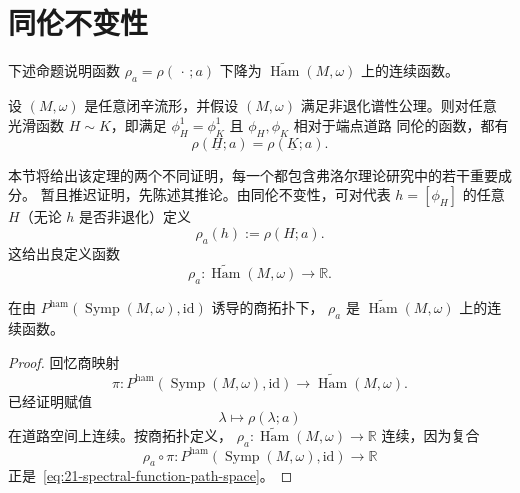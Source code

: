 \section{同伦不变性}
\label{sec:spectral-homotopy-invariance}

下述命题说明函数 $\rho_a=\rho(\,\cdot\,;a)$ 下降为
$\widetilde{\operatorname{Ham}}(M,\omega)$ 上的连续函数。

\begin{theorem}[同伦不变性]
\label{thm:21-spectral-homotopy-invariance}
设 $(M,\omega)$ 是任意闭辛流形，并假设 $(M,\omega)$ 满足非退化谱性公理。则对任意
光滑函数 $H\sim K$，即满足 $\phi_H^1=\phi_K^1$ 且 $\phi_H,\phi_K$ 相对于端点道路
同伦的函数，都有
\begin{equation}
 \rho(\underline H;a)=\rho(\underline K;a).
 \label{eq:21-spectral-homotopy-equality}
\end{equation}
\end{theorem}

本节将给出该定理的两个不同证明，每一个都包含弗洛尔理论研究中的若干重要成分。
暂且推迟证明，先陈述其推论。由同伦不变性，可对代表
$h=[\phi_H]$ 的任意 $H$（无论 $h$ 是否非退化）定义
\begin{equation}
 \rho_a(h):=\rho(H;a).
 \label{eq:21-spectral-function-cover}
\end{equation}
这给出良定义函数
\[
 \rho_a:\widetilde{\operatorname{Ham}}(M,\omega)\longrightarrow\mathbb R.
\]

\begin{theorem}
\label{thm:21-spectral-function-continuous-cover}
在由 $P^{\mathrm{ham}}(\operatorname{Symp}(M,\omega),\mathrm{id})$ 诱导的商拓扑下，
$\rho_a$ 是 $\widetilde{\operatorname{Ham}}(M,\omega)$ 上的连续函数。
\end{theorem}

\begin{proof}
回忆商映射
\[
 \pi:P^{\mathrm{ham}}(\operatorname{Symp}(M,\omega),\mathrm{id})
 \longrightarrow\widetilde{\operatorname{Ham}}(M,\omega).
\]
已经证明赋值
\begin{equation}
 \lambda\longmapsto\rho(\lambda;a)
 \label{eq:21-spectral-function-path-space}
\end{equation}
在道路空间上连续。按商拓扑定义，
$\rho_a:\widetilde{\operatorname{Ham}}(M,\omega)\to\mathbb R$ 连续，因为复合
\[
 \rho_a\circ\pi:
 P^{\mathrm{ham}}(\operatorname{Symp}(M,\omega),\mathrm{id})\longrightarrow\mathbb R
\]
正是~\eqref{eq:21-spectral-function-path-space}。
\end{proof}


